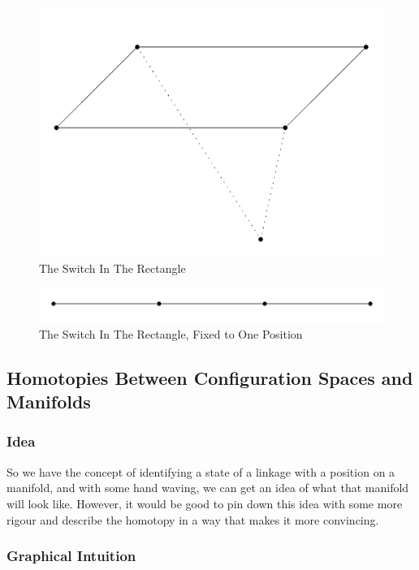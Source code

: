 \documentclass{article}
\begin{document}
\begin{figure}[h!]
\centering
\includegraphics[scale=0.4]{./images/rectangle_skewed_alt_switch.png}
\caption{The Switch In The Rectangle}
\label{fig:The Rectangle Switch}
\end{figure}



\begin{figure}[h!]
\centering
\includegraphics[scale=0.4]{./images/rectangle_flat.png}
\caption{The Switch In The Rectangle, Fixed to One Position}
\label{fig:Rectangle Flat}
\end{figure}

\subsection{Homotopies Between Configuration Spaces and Manifolds}

\subsubsection{Idea}

So we have the concept of identifying a state of a linkage with a position on a manifold, and with some hand waving, we can get an idea of what that manifold will look like. However, it would be good to pin down this idea with some more rigour and describe the homotopy in a way that makes it more convincing.

\subsubsection{Graphical Intuition}
\end{document}
